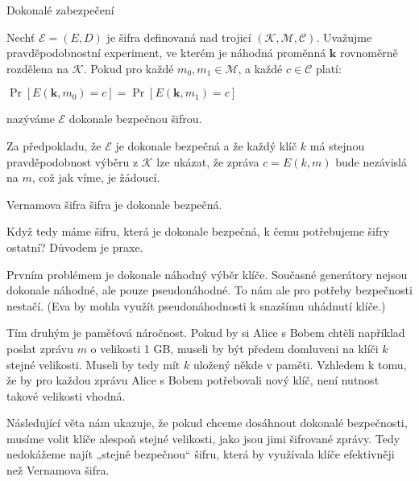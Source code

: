 \documentclass[
  program=infoi,
  biblatex,
  figures=false,
  glossaries,
  index
]{kidiplom}
\begin{document}

    \begin{definition}
        Dokonalé zabezpečení

        Nechť $\mathcal{E}=(E, D)$ je šifra definovaná nad trojicí $(\mathcal{K},\mathcal{M},\mathcal{C})$.
        Uvažujme pravděpodobnostní experiment, ve kterém je náhodná proměnná $\textbf{k}$ rovnoměrně rozdělena na $\mathcal{K}$.
        Pokud pro každé $m_0, m_1 \in \mathcal{M}$, a každé $c \in \mathcal{C}$ platí:

        \medskip
        $\Pr[E(\textbf{k},m_0) = c] = \Pr[E(\textbf{k},m_1) = c]$

        \medskip
        nazýváme $\mathcal{E}$ dokonale bezpečnou šifrou.
    \end{definition}

    Za předpokladu, že $\mathcal{E}$ je dokonale bezpečná a že každý klíč $k$ má stejnou pravděpodobnost
    výběru z $\mathcal{K}$ lze ukázat, že zpráva $c = E(k, m)$ bude nezávislá na $m$, což jak víme, je žádoucí.


    \begin{theorem}
        Vernamova šifra šifra je dokonale bezpečná.
    \end{theorem}


    \medskip
    
    Když tedy máme šifru, která je dokonale bezpečná, k čemu potřebujeme šifry ostatní? Důvodem je praxe.

    Prvním problémem je dokonale náhodný výběr klíče. Současné generátory nejsou dokonale náhodné, ale pouze pseudonáhodné.
    To nám ale pro potřeby bezpečnosti nestačí. (Eva by mohla využít pseudonáhodnosti k snazšímu uhádnutí klíče.)

    Tím druhým je paměťová náročnost. Pokud by si Alice s Bobem chtěli například poslat zprávu $m$ o velikosti 1 GB, museli by být předem
    domluveni na klíči $k$ stejné velikosti. Museli by tedy mít $k$ uložený někde v paměti. Vzhledem k tomu, že by
    pro každou zprávu Alice s Bobem potřebovali nový klíč, není nutnost takové velikosti vhodná.

    Následující věta nám ukazuje, že pokud chceme dosáhnout dokonalé bezpečnosti, musíme volit klíče alespoň stejné
    velikosti, jako jsou jimi šifrované zprávy. Tedy nedokážeme najít „stejně bezpečnou“ šifru, která by
    využívala klíče efektivněji než Vernamova šifra.
\end{document}
